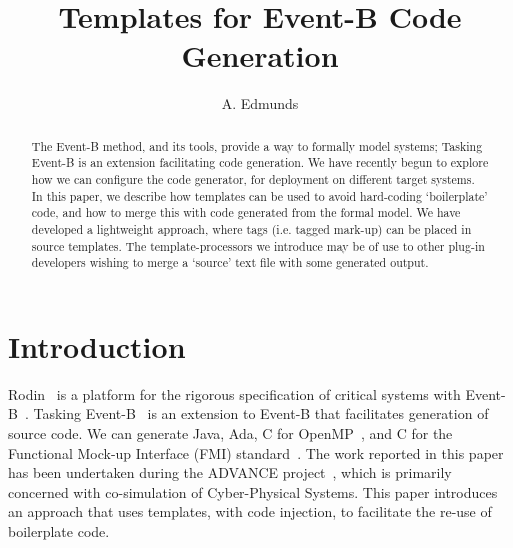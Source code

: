 \documentclass{llncs}%
\begin{document}
%
\title{Templates for Event-B Code Generation}

\author{A. Edmunds}


\maketitle
%
\begin{abstract}
The Event-B method, and  its tools, provide a way to formally model systems; Tasking Event-B is an extension facilitating code generation.  We have recently begun to explore how we can configure the code generator, for deployment on different target systems. In this paper, we describe how templates can be used to avoid hard-coding `boilerplate' code, and how to merge this with code generated from the formal model. We have developed a lightweight approach, where tags (i.e. tagged mark-up) can be placed in source templates. The template-processors we introduce may be of use to other plug-in developers wishing to merge a `source' text file with some generated output. 
 \end{abstract}
%
%
\section{Introduction}
%
Rodin~\cite{abrial10rodin} is a platform for the rigorous specification of critical systems with Event-B~\cite{ABR10}. Tasking Event-B~\cite{Edmunds2009,Edmunds2008,ae2011a,ae2012b} is an extension to Event-B that facilitates generation of source code. We can generate Java, Ada, C for OpenMP~\cite{openmp}, and C for the Functional Mock-up Interface (FMI) standard~\cite{FMISTD}. The work reported in this paper has been undertaken during the ADVANCE project~\cite{advance}, which is primarily concerned with co-simulation of Cyber-Physical Systems. This paper introduces an approach that uses templates, with code injection, to facilitate the re-use of boilerplate code.
\end{document}
